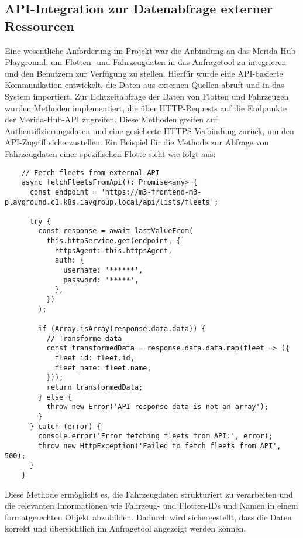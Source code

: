 \subsection*{API-Integration zur Datenabfrage externer Ressourcen}
Eine wesentliche Anforderung im Projekt war die Anbindung an das Merida Hub Playground, um Flotten- und Fahrzeugdaten in das Anfragetool zu integrieren und den Benutzern zur Verfügung zu stellen. Hierfür wurde eine API-basierte Kommunikation entwickelt, die Daten aus externen Quellen abruft und in das System importiert.
\newline
Zur Echtzeitabfrage der Daten von Flotten und Fahrzeugen wurden Methoden implementiert, die über HTTP-Requests auf die Endpunkte der Merida-Hub-API zugreifen. Diese Methoden greifen auf Authentifizierungsdaten und eine gesicherte HTTPS-Verbindung zurück, um den API-Zugriff sicherzustellen.
\newline
Ein Beispiel für die Methode zur Abfrage von Fahrzeugdaten einer spezifischen Flotte sieht wie folgt aus:

\begin{lstlisting}
    // Fetch fleets from external API
    async fetchFleetsFromApi(): Promise<any> {
      const endpoint = 'https://m3-frontend-m3-playground.c1.k8s.iavgroup.local/api/lists/fleets';
   
      try {
        const response = await lastValueFrom(
          this.httpService.get(endpoint, {
            httpsAgent: this.httpsAgent,
            auth: {
              username: '******',
              password: '*****',
            },
          })
        );
   
        if (Array.isArray(response.data.data)) {
          // Transforme data
          const transformedData = response.data.data.map(fleet => ({
            fleet_id: fleet.id,
            fleet_name: fleet.name,
          }));
          return transformedData;
        } else {
          throw new Error('API response data is not an array');
        }
      } catch (error) {
        console.error('Error fetching fleets from API:', error);
        throw new HttpException('Failed to fetch fleets from API', 500);
      }
    }
\end{lstlisting}
Diese Methode ermöglicht es, die Fahrzeugdaten strukturiert zu verarbeiten und die relevanten Informationen wie Fahrzeug- und Flotten-IDs und Namen in einem formatgerechten Objekt abzubilden. Dadurch wird sichergestellt, dass die Daten korrekt und übersichtlich im Anfragetool angezeigt werden können.
